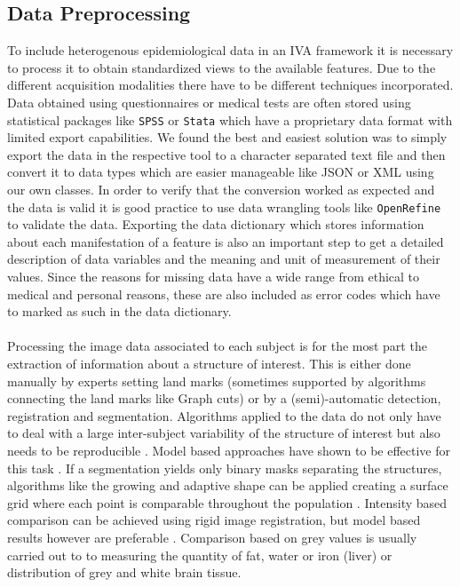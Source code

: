 \documentclass[journal]{style/vgtc}           %
\begin{document}
\subsection{Data Preprocessing}
To include heterogenous epidemiological data in an IVA framework it is necessary to process it to obtain standardized views to the available features.
%
Due to the different acquisition modalities there have to be different techniques incorporated.
%
Data obtained using questionnaires or medical tests are often stored using statistical packages like \texttt{SPSS} or \texttt{Stata} which have a proprietary data format with limited export capabilities.
%
We found the best and easiest solution was to simply export the data in the respective tool to a character separated text file and then convert it to data types which are easier manageable like JSON or XML using our own classes.
%
In order to verify that the conversion worked as expected and the data is valid it is good practice to use data wrangling tools like \texttt{OpenRefine} to validate the data.
%
Exporting the data dictionary which stores information about each manifestation of a feature is also an important step to get a detailed description of data variables and the meaning and unit of measurement of their values.
%
Since the reasons for missing data have a wide range from ethical to medical and personal reasons, these are also included as error codes which have to marked as such in the data dictionary.
\\\\
Processing the image data associated to each subject is for the most part the extraction of information about a structure of interest.
%
This is either done manually by experts setting land marks (sometimes supported by algorithms connecting the land marks like Graph cuts) or by a (semi)-automatic detection, registration and segmentation.
%
Algorithms applied to the data do not only have to deal with a large inter-subject variability of the structure of interest but also needs to be reproducible \cite{Preim2014}.
%
Model based approaches have shown to be effective for this task \cite{Gloger2010, Gloger2012, Rak2013}.
%
If a segmentation yields only binary masks separating the structures, algorithms like the growing and adaptive shape can be applied creating a surface grid where each point is comparable throughout the population \cite{Ferrarini2007}.
%
Intensity based comparison can be achieved using rigid image registration, but model based results however are preferable \cite{Klemm2012}.
%
Comparison based on grey values is usually carried out to to measuring the quantity of fat, water or iron (liver) or distribution of grey and white brain tissue.
\end{document}
